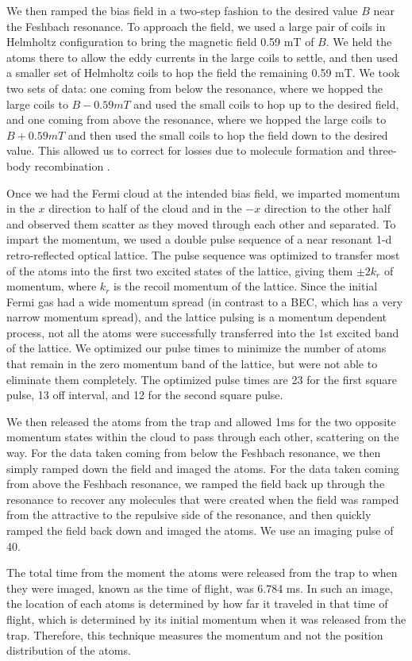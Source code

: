 \documentclass[12pt]{iopart}
\begin{document}
\par We then ramped the bias field in a two-step fashion to the desired value $B$ near the Feshbach resonance. To approach the field, we used a large pair of  coils in Helmholtz configuration to bring the magnetic field 0.59 mT of $B$. We held the atoms there to allow the eddy currents in the large coils to settle, and then used a smaller set of Helmholtz coils to hop the field the remaining 0.59 mT. We took two sets of data: one coming from below the resonance, where we hopped the large coils to $B-0.59 mT$ and used the small coils to hop up to the desired field, and one coming from above the resonance, where we hopped the large coils to  $B+0.59 mT$ and then used the small coils to hop the field down to the desired value. This allowed us to correct for losses due to molecule formation and three-body recombination \cite{Chin10}.
\par Once we had the Fermi cloud at the intended bias field, we imparted momentum in the $x$ direction to half of the cloud and in the $-x$ direction to the other half and observed them scatter as they moved through each other and separated. To impart the momentum, we used a double pulse sequence \cite{Wu05} of a near resonant 1-d retro-reflected optical lattice. The pulse sequence was optimized to transfer most of the atoms into the first two excited states of the lattice, giving them $\pm 2k_r$ of momentum, where $k_r$ is the recoil momentum of the lattice. Since the initial Fermi gas had a wide momentum spread (in contrast to a BEC, which has a very narrow momentum spread), and the lattice pulsing is a momentum dependent process, not all the atoms were successfully transferred into the 1st excited band of the lattice. We optimized our pulse times to minimize the number of atoms that remain in the zero momentum band of the lattice, but were not able to eliminate them completely. The optimized pulse times are 23\us{} for the first square pulse, 13\us{} off interval, and 12\us{} for the second square pulse. 
\par We then released the atoms from the trap and allowed 1ms for the two opposite momentum states within the cloud to pass through each other, scattering on the way. For the data taken coming from below the Feshbach resonance, we then simply ramped down the field and imaged the atoms. For the data taken coming from above the Feshbach resonance, we ramped the field back up through the resonance to recover any molecules that were created when the field was ramped from the attractive to the repulsive side of the resonance, and then quickly ramped the field back down and imaged the atoms. We use an imaging pulse of 40\us{}. 
\par The total time from the moment the atoms were released from the trap to when they were imaged, known as the time of flight, was 6.784 ms. In such an image, the location of each atoms is determined by how far it traveled in that time of flight, which is determined by its initial momentum when it was released from the trap. Therefore, this technique measures the momentum and not the position distribution of the atoms. 
\end{document}

